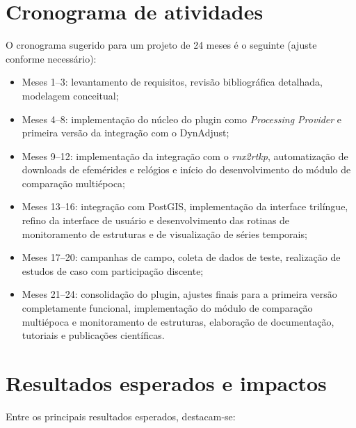 \documentclass[
        12pt,                           %
        openright,                      %
        oneside,
        a4paper,                        %
        chapter=TITLE,         %
        section=TITLE,         %
        subsection=Title,      %
        english,                        %
        portugues,                      %
        ]{abntex2}
\begin{document}
\chapter{Cronograma de atividades}

O cronograma sugerido para um projeto de 24 meses é o seguinte (ajuste conforme necessário):

\begin{itemize}
    \item Meses 1--3: levantamento de requisitos, revisão bibliográfica detalhada, modelagem conceitual;
    \item Meses 4--8: implementação do núcleo do plugin como \textit{Processing Provider} e primeira versão da integração com o DynAdjust;
    \item Meses 9--12: implementação da integração com o \textit{rnx2rtkp}, automatização de downloads de efemérides e relógios e início do desenvolvimento do módulo de comparação multiépoca;
    \item Meses 13--16: integração com PostGIS, implementação da interface trilíngue, refino da interface de usuário e desenvolvimento das rotinas de monitoramento de estruturas e de visualização de séries temporais;
    \item Meses 17--20: campanhas de campo, coleta de dados de teste, realização de estudos de caso com participação discente;
    \item Meses 21--24: consolidação do plugin, ajustes finais para a primeira versão completamente funcional, implementação do módulo de comparação multiépoca e monitoramento de estruturas, elaboração de documentação, tutoriais e publicações científicas.
\end{itemize}

\chapter{Resultados esperados e impactos}

Entre os principais resultados esperados, destacam-se:
\end{document}
